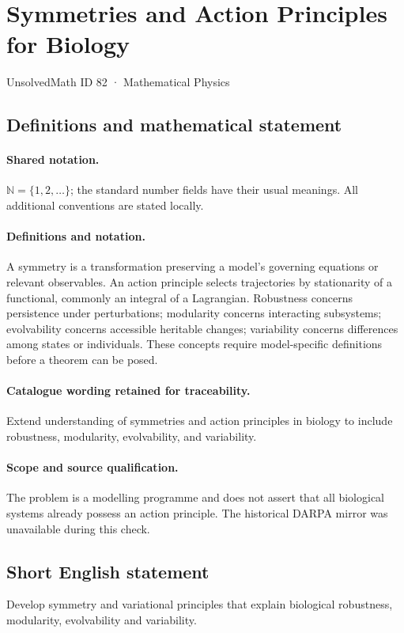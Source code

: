 \documentclass[11pt]{article}
\begin{document}
\setcounter{section}{81}
\section{Symmetries and Action Principles for Biology}\label{82}
{\small UnsolvedMath ID 82 · Mathematical Physics}
\subsection{Definitions and mathematical statement}

\paragraph{Shared notation.}$\mathbb N=\{1,2,\ldots\}$; the standard number fields have their usual meanings. All additional conventions are stated locally.


\paragraph{Definitions and notation.}A symmetry is a transformation preserving a model’s governing equations or relevant observables. An action principle selects trajectories by stationarity of a functional, commonly an integral of a Lagrangian. Robustness concerns persistence under perturbations; modularity concerns interacting subsystems; evolvability concerns accessible heritable changes; variability concerns differences among states or individuals. These concepts require model-specific definitions before a theorem can be posed.

\paragraph{Catalogue wording retained for traceability.}
Extend understanding of symmetries and action principles in biology to include robustness, modularity, evolvability, and variability.
\paragraph{Scope and source qualification.}The problem is a modelling programme and does not assert that all biological systems already possess an action principle. The historical DARPA mirror was unavailable during this check.
\subsection{Short English statement}
Develop symmetry and variational principles that explain biological robustness, modularity, evolvability and variability.
\end{document}
